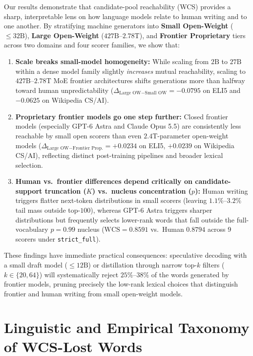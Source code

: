 \documentclass[11pt,a4paper,twocolumn]{article}
\begin{document}
Our results demonstrate that candidate-pool reachability (WCS) provides a sharp, interpretable lens on how language models relate to human writing and to one another. By stratifying machine generators into \textbf{Small Open-Weight} ($\le 32\text{B}$), \textbf{Large Open-Weight} ($427\text{B}$--$2.78\text{T}$), and \textbf{Frontier Proprietary} tiers across two domains and four scorer families, we show that:
\begin{enumerate}
    \item \textbf{Scale breaks small-model homogeneity:} While scaling from $2\text{B}$ to $27\text{B}$ within a dense model family slightly \emph{increases} mutual reachability, scaling to $427\text{B}$--$2.78\text{T}$ MoE frontier architectures shifts generations more than halfway toward human unpredictability ($\Delta_{\text{Large OW} - \text{Small OW}} = -0.0795$ on ELI5 and $-0.0625$ on Wikipedia CS/AI).
    \item \textbf{Proprietary frontier models go one step further:} Closed frontier models (especially GPT-6 Astra and Claude Opus 5.5) are consistently less reachable by small open scorers than even $2.4\text{T}$-parameter open-weight models ($\Delta_{\text{Large OW} - \text{Frontier Prop.}} = +0.0234$ on ELI5, $+0.0239$ on Wikipedia CS/AI), reflecting distinct post-training pipelines and broader lexical selection.
    \item \textbf{Human vs.\ frontier differences depend critically on candidate-support truncation ($K$) vs.\ nucleus concentration ($p$):} Human writing triggers flatter next-token distributions in small scorers (leaving $1.1\%$--$3.2\%$ tail mass outside top-$100$), whereas GPT-6 Astra triggers sharper distributions but frequently selects lower-rank words that fall outside the full-vocabulary $p=0.99$ nucleus ($\text{WCS}=0.8591$ vs.\ Human $0.8794$ across 9 scorers under \texttt{strict\_full}).
\end{enumerate}
These findings have immediate practical consequences: speculative decoding with a small draft model ($\le 12\text{B}$) or distillation through narrow top-$k$ filters ($k \in \{20, 64\}$) will systematically reject $25\%$--$38\%$ of the words generated by frontier models, pruning precisely the low-rank lexical choices that distinguish frontier and human writing from small open-weight models.




\appendix
\section{Linguistic and Empirical Taxonomy of WCS-Lost Words}
\label{sec:appendix_lost_words}
\end{document}
